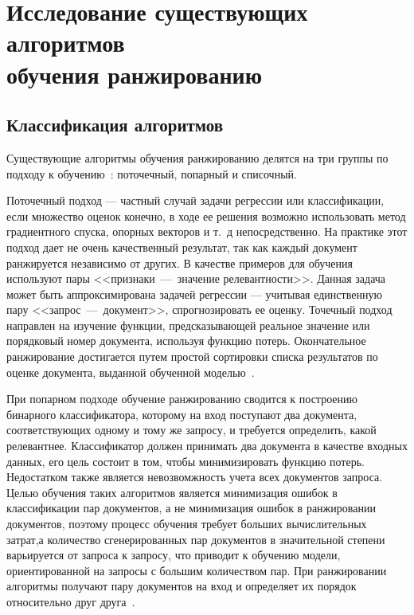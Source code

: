 \chapter[Исследование существующих алгоритмов обучения\\ранжированию]{Исследование существующих алгоритмов \\обучения ранжированию}

\section{Классификация алгоритмов}

Существующие алгоритмы обучения ранжированию делятся на три группы по подходу к обучению~\cite{ML_for_SE}: поточечный, попарный и списочный.

Поточечный подход --- частный случай задачи регрессии или классификации, если множество оценок конечно, в ходе ее решения возможно использовать метод градиентного спуска, опорных векторов и т.~д непосредственно. На практике этот подход дает не очень качественный результат, так как каждый документ ранжируется независимо от других. В качестве примеров для обучения используют пары <<признаки~---~значение релевантности>>. Данная задача может быть аппроксимирована задачей регрессии --- учитывая единственную пару <<запрос~---~документ>>, спрогнозировать ее оценку. Точечный подход направлен на изучение функции, предсказывающей реальное значение или порядковый номер документа, используя функцию потерь. Окончательное ранжирование достигается путем простой сортировки списка результатов по оценке документа, выданной обученной моделью~\cite{LR_BOOK}.

При попарном подходе обучение ранжированию сводится к построению бинарного классификатора, которому на вход поступают два документа, соответствующих одному и тому же запросу, и требуется определить, какой релевантнее. Классификатор должен принимать два документа в качестве входных данных, его цель состоит в том, чтобы минимизировать функцию потерь. Недостатком также является невозвомжность учета всех документов запроса. Целью обучения таких алгоритмов является минимизация ошибок в классификации пар документов, а не минимизация ошибок в ранжировании документов, поэтому процесс обучения требует больших вычислительных затрат,а количество сгенерированных пар документов в значительной степени варьируется от запроса к запросу, что приводит к обучению модели, ориентированной на запросы с большим количеством пар. При ранжировании алгоритмы получают пару документов на вход и определяет их порядок относительно друг друга~\cite{LR_BOOK}.

